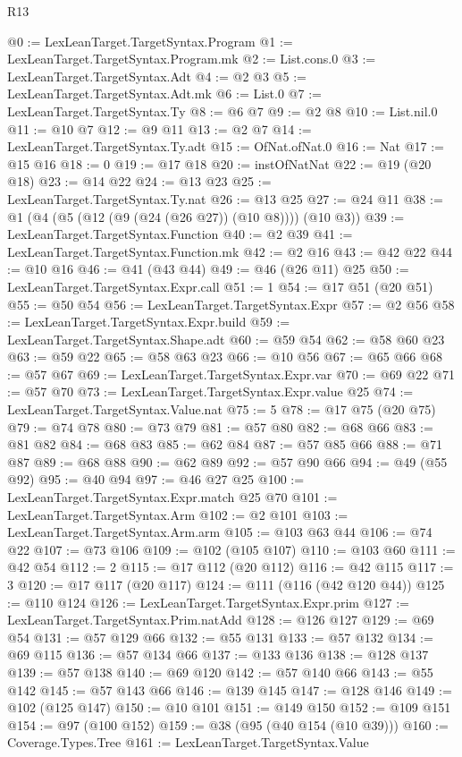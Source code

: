 \begin{lexlean}{R13}
\begin{coremodule}
@0 := LexLeanTarget.TargetSyntax.Program
@1 := LexLeanTarget.TargetSyntax.Program.mk
@2 := List.cons.{0}
@3 := LexLeanTarget.TargetSyntax.Adt
@4 := @2 @3
@5 := LexLeanTarget.TargetSyntax.Adt.mk
@6 := List.{0}
@7 := LexLeanTarget.TargetSyntax.Ty
@8 := @6 @7
@9 := @2 @8
@10 := List.nil.{0}
@11 := @10 @7
@12 := @9 @11
@13 := @2 @7
@14 := LexLeanTarget.TargetSyntax.Ty.adt
@15 := OfNat.ofNat.{0}
@16 := Nat
@17 := @15 @16
@18 := 0
@19 := @17 @18
@20 := instOfNatNat
@22 := @19 (@20 @18)
@23 := @14 @22
@24 := @13 @23
@25 := LexLeanTarget.TargetSyntax.Ty.nat
@26 := @13 @25
@27 := @24 @11
@38 := @1 (@4 (@5 (@12 (@9 (@24 (@26 @27)) (@10 @8)))) (@10 @3))
@39 := LexLeanTarget.TargetSyntax.Function
@40 := @2 @39
@41 := LexLeanTarget.TargetSyntax.Function.mk
@42 := @2 @16
@43 := @42 @22
@44 := @10 @16
@46 := @41 (@43 @44)
@49 := @46 (@26 @11) @25
@50 := LexLeanTarget.TargetSyntax.Expr.call
@51 := 1
@54 := @17 @51 (@20 @51)
@55 := @50 @54
@56 := LexLeanTarget.TargetSyntax.Expr
@57 := @2 @56
@58 := LexLeanTarget.TargetSyntax.Expr.build
@59 := LexLeanTarget.TargetSyntax.Shape.adt
@60 := @59 @54
@62 := @58 @60 @23
@63 := @59 @22
@65 := @58 @63 @23
@66 := @10 @56
@67 := @65 @66
@68 := @57 @67
@69 := LexLeanTarget.TargetSyntax.Expr.var
@70 := @69 @22
@71 := @57 @70
@73 := LexLeanTarget.TargetSyntax.Expr.value @25
@74 := LexLeanTarget.TargetSyntax.Value.nat
@75 := 5
@78 := @17 @75 (@20 @75)
@79 := @74 @78
@80 := @73 @79
@81 := @57 @80
@82 := @68 @66
@83 := @81 @82
@84 := @68 @83
@85 := @62 @84
@87 := @57 @85 @66
@88 := @71 @87
@89 := @68 @88
@90 := @62 @89
@92 := @57 @90 @66
@94 := @49 (@55 @92)
@95 := @40 @94
@97 := @46 @27 @25
@100 := LexLeanTarget.TargetSyntax.Expr.match @25 @70
@101 := LexLeanTarget.TargetSyntax.Arm
@102 := @2 @101
@103 := LexLeanTarget.TargetSyntax.Arm.arm
@105 := @103 @63 @44
@106 := @74 @22
@107 := @73 @106
@109 := @102 (@105 @107)
@110 := @103 @60
@111 := @42 @54
@112 := 2
@115 := @17 @112 (@20 @112)
@116 := @42 @115
@117 := 3
@120 := @17 @117 (@20 @117)
@124 := @111 (@116 (@42 @120 @44))
@125 := @110 @124
@126 := LexLeanTarget.TargetSyntax.Expr.prim
@127 := LexLeanTarget.TargetSyntax.Prim.natAdd
@128 := @126 @127
@129 := @69 @54
@131 := @57 @129 @66
@132 := @55 @131
@133 := @57 @132
@134 := @69 @115
@136 := @57 @134 @66
@137 := @133 @136
@138 := @128 @137
@139 := @57 @138
@140 := @69 @120
@142 := @57 @140 @66
@143 := @55 @142
@145 := @57 @143 @66
@146 := @139 @145
@147 := @128 @146
@149 := @102 (@125 @147)
@150 := @10 @101
@151 := @149 @150
@152 := @109 @151
@154 := @97 (@100 @152)
@159 := @38 (@95 (@40 @154 (@10 @39)))
@160 := Coverage.Types.Tree
@161 := LexLeanTarget.TargetSyntax.Value

\end{coremodule}
\end{lexlean}
